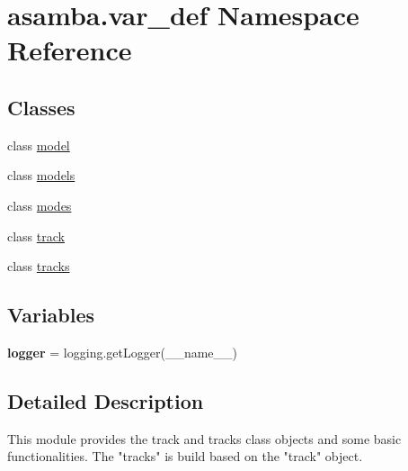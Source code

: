 \hypertarget{namespaceasamba_1_1var__def}{}\section{asamba.\+var\+\_\+def Namespace Reference}
\label{namespaceasamba_1_1var__def}
\subsection*{Classes}
\begin{DoxyCompactItemize}
\item 
class \hyperlink{classasamba_1_1var__def_1_1model}{model}
\item 
class \hyperlink{classasamba_1_1var__def_1_1models}{models}
\item 
class \hyperlink{classasamba_1_1var__def_1_1modes}{modes}
\item 
class \hyperlink{classasamba_1_1var__def_1_1track}{track}
\item 
class \hyperlink{classasamba_1_1var__def_1_1tracks}{tracks}
\end{DoxyCompactItemize}
\subsection*{Variables}
\begin{DoxyCompactItemize}
\item 
\mbox{\label{namespaceasamba_1_1var__def_a59ded9e44873b4e1e3c4c951bb08617c}} 
{\bfseries logger} = logging.\+get\+Logger(\+\_\+\+\_\+name\+\_\+\+\_\+)
\end{DoxyCompactItemize}


\subsection{Detailed Description}
\begin{DoxyVerb}This module provides the track and tracks class objects and some basic functionalities. The "tracks"
is build based on the "track" object.
\end{DoxyVerb}
 